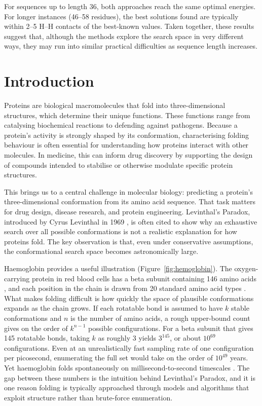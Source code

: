 \documentclass[12pt, oneside, openany]{book}
\theoremstyle{plain}
\theoremstyle{definition}
\begin{document}
For sequences up to length 36, both approaches reach the same optimal energies. For longer instances (46--58 residues), the best solutions found are typically within 2--5 H--H contacts of the best-known values. Taken together, these results suggest that, although the methods explore the search space in very different ways, they may run into similar practical difficulties as sequence length increases.

\newpage
\tableofcontents

\chapter{Introduction}

Proteins are biological macromolecules that fold into three-dimensional structures, which determine their unique functions. These functions range from catalysing biochemical reactions to defending against pathogens. Because a protein's activity is strongly shaped by its conformation, characterising folding behaviour is often essential for understanding how proteins interact with other molecules. In medicine, this can inform drug discovery by supporting the design of compounds intended to stabilise or otherwise modulate specific protein structures.

This brings us to a central challenge in molecular biology: predicting a protein's three-dimensional conformation from its amino acid sequence. That task matters for drug design, disease research, and protein engineering. Levinthal's Paradox, introduced by Cyrus Levinthal in 1969 \cite{Levinthal1969}, is often cited to show why an exhaustive search over all possible conformations is not a realistic explanation for how proteins fold. The key observation is that, even under conservative assumptions, the conformational search space becomes astronomically large.

Haemoglobin provides a useful illustration (Figure~\ref{fig:hemoglobin}). The oxygen-carrying protein in red blood cells has a beta subunit containing 146 amino acids \cite{NCBI_Hemoglobin}, and each position in the chain is drawn from 20 standard amino acid types \cite{NCBI_AminoAcids}. What makes folding difficult is how quickly the space of plausible conformations expands as the chain grows. If each rotatable bond is assumed to have $k$ stable conformations and $n$ is the number of amino acids, a rough upper-bound count gives on the order of $k^{n-1}$ possible configurations. For a beta subunit that gives 145 rotatable bonds, taking $k$ as roughly 3 yields $3^{145}$, or about $10^{69}$ configurations. Even at an unrealistically fast sampling rate of one configuration per picosecond, enumerating the full set would take on the order of $10^{49}$ years. Yet haemoglobin folds spontaneously on millisecond-to-second timescales \cite{Eaton1996}. The gap between these numbers is the intuition behind Levinthal's Paradox, and it is one reason folding is typically approached through models and algorithms that exploit structure rather than brute-force enumeration.
\end{document}
